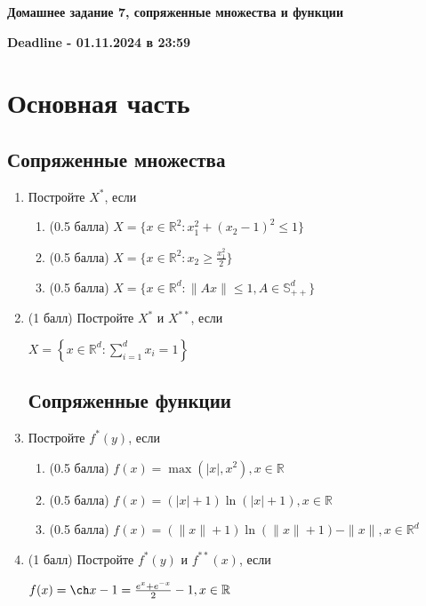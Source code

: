 \documentclass[a5paper,twoside,russian,8pt]{article}
\def  \R {\mathbb R}
\newcommand{\St}{\mathbb{S}}
\begin{document}
\begin{center}
    \textbf{Домашнее задание 7, сопряженные множества и функции}
\end{center}
\begin{center}
    \textbf{Deadline - 01.11.2024 в 23:59}
\end{center}

\section*{Основная часть}
\subsection*{Сопряженные множества}
\begin{enumerate}[label=\textbf{Задача \arabic*.}]

\item Постройте $X^*$, если
\begin{enumerate}

    \item (0.5 балла) $X = \{x \in \R^2 : x_1^2+(x_2-1)^2 \leq 1\}$
    \item (0.5 балла) $X = \{x \in \R^2 : x_2\geq \frac{x_1^2}{2}\}$
    \item (0.5 балла) $X = \{x \in \R^d : \|Ax\| \leq 1, A \in \St^d_{++} \}$
    
\end{enumerate}

\item (1 балл) Постройте $X^*$ и $X^{**}$, если 

$X = \left\{x \in \R^d : \sum\limits_{i=1}^d x_i = 1 \right\}$

\subsection*{Сопряженные функции}

\item Постройте $f^{*}(y)$, если
\begin{enumerate}
    \item (0.5 балла) $f(x) = \max(|x|, x^2), x\in \R$
    \item (0.5 балла) $f(x) = (|x| + 1)\ln(|x|+1), x\in \R$
    \item (0.5 балла) $f(x)=(\|x\|+1)\ln(\|x\|+1)-\|x\|, x\in \R^d$
    
\end{enumerate}

\item (1 балл) Постройте $f^*(y)$ и $f^{**}(x)$, если 

$f(x) = \ch x - 1 = \frac{e^x+e^{-x}}{2} - 1, x\in \R$

\end{enumerate}
\end{document}
